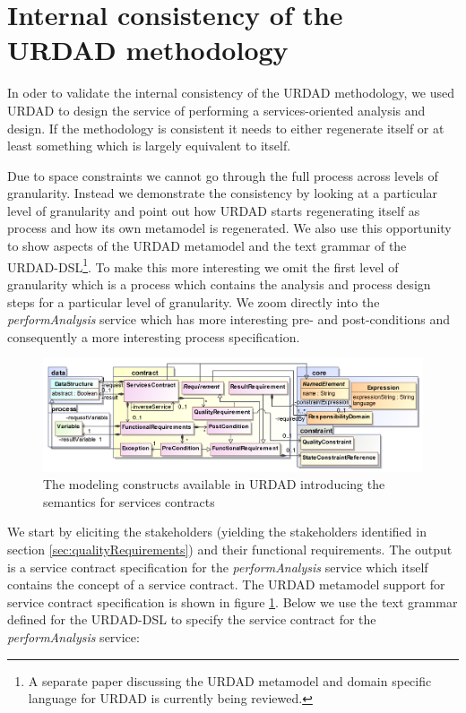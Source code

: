 \section{Internal consistency of the URDAD methodology}
\label{sec:urdadConsistency}

In oder to validate the internal consistency of the URDAD methodology, we used URDAD to design the service of performing a services-oriented analysis and design. If the methodology is consistent it needs to either regenerate itself or at least something which is largely equivalent to itself. 

Due to space constraints we cannot go through the full process across levels of granularity. Instead we demonstrate the consistency by looking at a particular level of granularity and point out how URDAD starts regenerating itself as process and how its own metamodel is regenerated. We also use this opportunity to show aspects of the URDAD metamodel and the text grammar of the URDAD-DSL\footnote{A separate paper discussing the URDAD metamodel and domain specific language for URDAD is currently being reviewed.}. To make this more interesting we omit the first level of granularity which is a process which contains the analysis and process design steps for a particular level of granularity. We zoom directly into the \emph{performAnalysis} service which has more interesting pre- and post-conditions and consequently a more interesting process specification.

\begin{figure}[Htbp]
  \centering
  \includegraphics{contract}
  \caption{The modeling constructs available in URDAD introducing the semantics for services contracts}
  \label{fig:contractModule}
\end{figure}

We start by eliciting the stakeholders (yielding the stakeholders identified in section \ref{sec:qualityRequirements}) and their functional requirements. The output is a service contract specification for the \emph{performAnalysis} service which itself contains the concept of a service contract. The URDAD metamodel support for service contract specification is shown in figure \ref{fig:contractModule}. Below we use the text grammar defined for the URDAD-DSL to specify the service contract for the \emph{performAnalysis} service:

